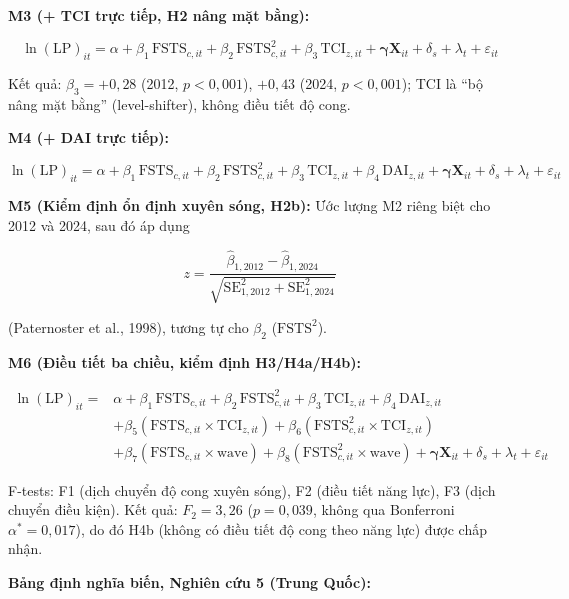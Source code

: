 \documentclass[
  a4paper,
  13pt]{extreport}
\begin{document}
\textbf{M3 (+ TCI trực tiếp, H2 nâng mặt bằng):}

\[\ln(\mathrm{LP})_{it} = \alpha + \beta_1\,\mathrm{FSTS}_{c,it} + \beta_2\,\mathrm{FSTS}_{c,it}^{2} + \beta_3\,\mathrm{TCI}_{z,it} + \boldsymbol{\gamma}\mathbf{X}_{it} + \delta_s + \lambda_t + \varepsilon_{it}\]

Kết quả: \(\beta_3 = +0{,}28\) (2012, \(p < 0{,}001\)), \(+0{,}43\)
(2024, \(p < 0{,}001\)); TCI là ``bộ nâng mặt bằng'' (level-shifter),
không điều tiết độ cong.

\textbf{M4 (+ DAI trực tiếp):}

\[\ln(\mathrm{LP})_{it} = \alpha + \beta_1\,\mathrm{FSTS}_{c,it} + \beta_2\,\mathrm{FSTS}_{c,it}^{2} + \beta_3\,\mathrm{TCI}_{z,it} + \beta_4\,\mathrm{DAI}_{z,it} + \boldsymbol{\gamma}\mathbf{X}_{it} + \delta_s + \lambda_t + \varepsilon_{it}\]

\textbf{M5 (Kiểm định ổn định xuyên sóng, H2b):} Ước lượng M2 riêng biệt
cho 2012 và 2024, sau đó áp dụng

\[z = \frac{\hat\beta_{1,2012} - \hat\beta_{1,2024}}{\sqrt{\mathrm{SE}_{1,2012}^{2} + \mathrm{SE}_{1,2024}^{2}}}\]

(Paternoster et al., 1998), tương tự cho \(\beta_2\)
(\(\mathrm{FSTS}^{2}\)).

\textbf{M6 (Điều tiết ba chiều, kiểm định H3/H4a/H4b):}

\[\begin{aligned}
\ln(\mathrm{LP})_{it} = {} & \alpha + \beta_1\,\mathrm{FSTS}_{c,it} + \beta_2\,\mathrm{FSTS}_{c,it}^{2} + \beta_3\,\mathrm{TCI}_{z,it} + \beta_4\,\mathrm{DAI}_{z,it} \\
& + \beta_5(\mathrm{FSTS}_{c,it} \times \mathrm{TCI}_{z,it}) + \beta_6(\mathrm{FSTS}_{c,it}^{2} \times \mathrm{TCI}_{z,it}) \\
& + \beta_7(\mathrm{FSTS}_{c,it} \times \mathrm{wave}) + \beta_8(\mathrm{FSTS}_{c,it}^{2} \times \mathrm{wave}) + \boldsymbol{\gamma}\mathbf{X}_{it} + \delta_s + \lambda_t + \varepsilon_{it}
\end{aligned}\]

F-tests: F1 (dịch chuyển độ cong xuyên sóng), F2 (điều tiết năng lực),
F3 (dịch chuyển điều kiện). Kết quả: \(F_2 = 3{,}26\) (\(p = 0{,}039\),
không qua Bonferroni \(\alpha^{*} = 0{,}017\)), do đó H4b (không có điều
tiết độ cong theo năng lực) được chấp nhận.

\textbf{Bảng định nghĩa biến, Nghiên cứu 5 (Trung Quốc):}
\end{document}
